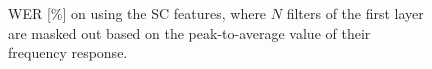 \begin{figure}[htb]
	\centering
	
	\vspace{-0.3cm}
	\caption{\gls{WER} [\%] on \devother using the \gls{SC} features, where $N$ filters of the first layer are masked out based on the peak-to-average value of their frequency response.}
	\label{fig:masked_filters}
\end{figure}
